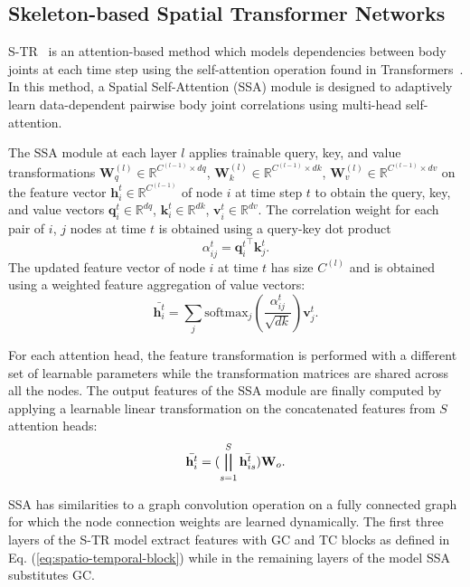 \documentclass[journal]{IEEEtran}
\theoremstyle{definition}
\begin{document}
\subsection{Skeleton-based Spatial Transformer Networks}
S-TR~\cite{plizzari2021skeleton} is an attention-based method which 
models dependencies between body joints at each time step using the self-attention operation found in Transformers~\cite{vaswani2017attention}. 
In this method, a Spatial Self-Attention (SSA) module is designed to adaptively learn data-dependent pairwise body joint correlations using multi-head self-attention. 

The SSA module at each layer $l$ applies trainable query, key, and value transformations $\mathbf{W}^{(l)}_q \in \mathbb{R}^{C^{(l-1)} \times dq}$, $\mathbf{W}^{(l)}_k \in \mathbb{R}^{C^{(l-1)} \times dk}$, $\mathbf{W}^{(l)}_v \in \mathbb{R}^{C^{(l-1)} \times dv}$ on the feature vector $\mathbf{h}_i^{t} \in \mathbb{R}^{C^{(l-1)}}$ of node $i$ at time step $t$ to obtain the query, key, and value vectors $\mathbf{q}_i^{t} \in \mathbb{R}^{dq}$, $\mathbf{k}_i^{t} \in \mathbb{R}^{dk}$, $\mathbf{v}_i^{t} \in \mathbb{R}^{dv}$. 
The correlation weight for each pair of $i$, $j$ nodes at time $t$ is obtained using a query-key dot product 
\begin{equation}
    \alpha_{ij}^{t} = {\mathbf{q}_i^{t}}^\top \mathbf{k}_j^{t}. \label{eq:query-key}
\end{equation}
The updated feature vector of node $i$ at time $t$ has size $C^{(l)}$ and is obtained using a weighted feature aggregation of value vectors:
\begin{equation}
    \bar{\mathbf{h}_i^{t}} = \sum_{j} \text{softmax}_j \left( \frac{\alpha_{ij}^t}{\sqrt{dk}}\right)\mathbf{v}_j^t.
    \label{eq:ssa}
\end{equation}

For each attention head, the feature transformation is performed with a different set of learnable parameters while the transformation matrices are shared across all the nodes.
The output features of the SSA module are finally computed by applying a learnable linear transformation on the concatenated features from $S$ attention heads:
\begin{equation}
    \bar{\mathbf{h}_i^{t}} = (\bigparallel_{s=1}^S \bar{\mathbf{h}_{is}^{t}}) \mathbf{W}_o.
    \label{eq:ssa_multihead}
\end{equation}

SSA has similarities to a graph convolution operation on a fully connected graph for which the node connection weights are learned dynamically. 
The first three layers of the S-TR model extract features with GC and TC blocks as defined in Eq. (\ref{eq:spatio-temporal-block}) while in the remaining layers of the model SSA substitutes GC.
\end{document}
